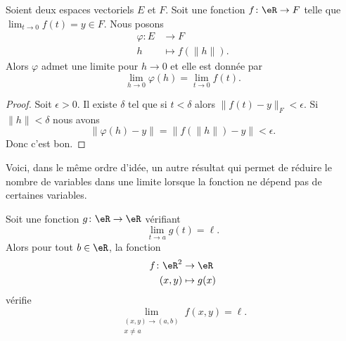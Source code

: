 \begin{lemma}
	Soient deux espaces vectoriels \( E\) et \( F\). Soit une fonction \( f\colon \eR\to F\) telle que \( \lim_{t\to 0} f(t)=y\in F\). Nous posons
	\begin{equation}
		\begin{aligned}
			\varphi\colon E & \to F               \\
			h               & \mapsto f(\| h \|).
		\end{aligned}
	\end{equation}
	Alors \( \varphi\) admet une limite pour \( h\to 0\) et elle est donnée par
	\begin{equation}
		\lim_{h\to 0} \varphi(h)=\lim_{t\to 0} f(t).
	\end{equation}
\end{lemma}

\begin{proof}
	Soit \( \epsilon>0\). Il existe \( \delta\) tel que si \( t<\delta\) alors \( \| f(t)-y \|_F<\epsilon\). Si \( \| h \|<\delta\) nous avons
	\begin{equation}
		\| \varphi(h)-y \|=\| f(\| h \|)-y \|<\epsilon.
	\end{equation}
	Donc c'est bon.
\end{proof}

Voici, dans le même ordre d'idée, un autre résultat qui permet de réduire le nombre de variables dans une limite lorsque la fonction ne dépend pas de certaines variables.

\begin{lemma}        \label{LEMooYLIHooFBQyzC}
	Soit une fonction \( g\colon \eR\to \eR\) vérifiant
	\begin{equation}
		\lim_{t\to a} g(t)=\ell.
	\end{equation}
	Alors pour tout \( b\in \eR\), la fonction
	\begin{equation}
		\begin{aligned}
			f\colon \eR^2 & \to \eR      \\
			(x,y)         & \mapsto g(x)
		\end{aligned}
	\end{equation}
	vérifie
	\begin{equation}
		\lim_{\substack{(x,y)\to(a,b)\\x\neq a}} f(x,y)=\ell.
	\end{equation}
\end{lemma}

